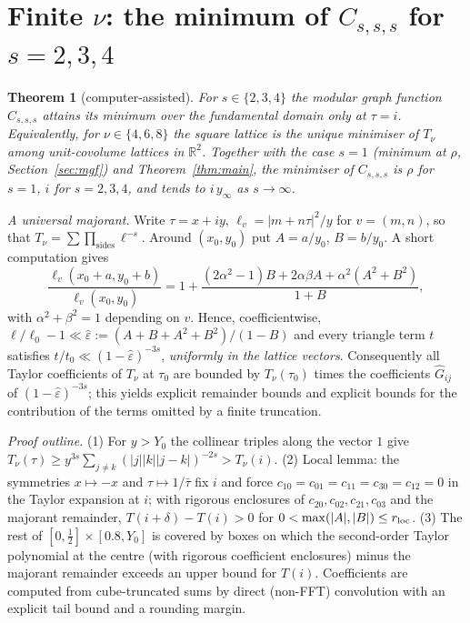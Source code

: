 \documentclass[11pt,a4paper]{amsart}
\newtheorem{theorem}{Theorem}
\theoremstyle{definition}
\newcommand{\R}{\mathbb{R}}
\begin{document}
\section{Finite \texorpdfstring{$\nu$}{nu}: the minimum of \texorpdfstring{$C_{s,s,s}$}{C_sss} for \texorpdfstring{$s=2,3,4$}{s=2,3,4}}\label{sec:finite}
\begin{theorem}[computer-assisted]\label{thm:sss}
For $s\in\{2,3,4\}$ the modular graph function $C_{s,s,s}$ attains its minimum over the fundamental domain only at $\tau=i$. Equivalently, for $\nu\in\{4,6,8\}$ the square lattice is the unique minimiser of $T_\nu$ among unit-covolume lattices in $\R^2$. Together with the case $s=1$ (minimum at $\rho$, Section~\ref{sec:mgf}) and Theorem~\ref{thm:main}, the minimiser of $C_{s,s,s}$ is $\rho$ for $s=1$, $i$ for $s=2,3,4$, and tends to $i\,y_\infty$ as $s\to\infty$.
\end{theorem}
\noindent\emph{A universal majorant.} Write $\tau=x+iy$, $\ell_v=|m+n\tau|^2/y$ for $v=(m,n)$, so that $T_\nu=\sum\prod_{\text{sides}}\ell^{-s}$. Around $(x_0,y_0)$ put $A=a/y_0$, $B=b/y_0$. A short computation gives
\[
\frac{\ell_v(x_0+a,y_0+b)}{\ell_v(x_0,y_0)}=1+\frac{(2\alpha^2-1)B+2\alpha\beta A+\alpha^2(A^2+B^2)}{1+B},
\]
with $\alpha^2+\beta^2=1$ depending on $v$. Hence, coefficientwise, $\ell/\ell_0-1\ll\hat\varepsilon:=(A+B+A^2+B^2)/(1-B)$ and every triangle term $t$ satisfies $t/t_0\ll(1-\hat\varepsilon)^{-3s}$, \emph{uniformly in the lattice vectors}. Consequently all Taylor coefficients of $T_\nu$ at $\tau_0$ are bounded by $T_\nu(\tau_0)$ times the coefficients $\hat G_{ij}$ of $(1-\hat\varepsilon)^{-3s}$; this yields explicit remainder bounds and explicit bounds for the contribution of the terms omitted by a finite truncation.

\noindent\emph{Proof outline.} (1) For $y>Y_0$ the collinear triples along the vector $1$ give $T_\nu(\tau)\ge y^{3s}\sum_{j\ne k}(|j||k||j-k|)^{-2s}>T_\nu(i)$. (2) Local lemma: the symmetries $x\mapsto-x$ and $\tau\mapsto1/\bar\tau$ fix $i$ and force $c_{10}=c_{01}=c_{11}=c_{30}=c_{12}=0$ in the Taylor expansion at $i$; with rigorous enclosures of $c_{20},c_{02},c_{21},c_{03}$ and the majorant remainder, $T(i+\delta)-T(i)>0$ for $0<\max(|A|,|B|)\le r_{\rm loc}$. (3) The rest of $[0,\tfrac12]\times[0.8,Y_0]$ is covered by boxes on which the second-order Taylor polynomial at the centre (with rigorous coefficient enclosures) minus the majorant remainder exceeds an upper bound for $T(i)$. Coefficients are computed from cube-truncated sums by direct (non-FFT) convolution with an explicit tail bound and a rounding margin.
\end{document}
